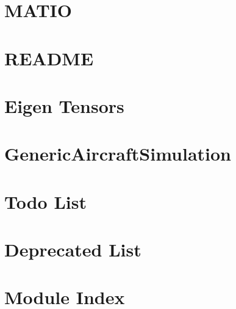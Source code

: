\documentclass[twoside]{book}
\newcommand{\+}{\discretionary{\mbox{\scriptsize$\hookleftarrow$}}{}{}}
\begin{document}
\chapter{M\+A\+T\+IO}
\label{md__c_1__users_janol__desktop__generic_aircraft_simulation_matio__r_e_a_d_m_e}

\chapter{R\+E\+A\+D\+ME}
\label{md__c_1__users_janol__desktop__generic_aircraft_simulation_matio_visual_studio_test_eigen__r_e_a_d_m_e}

\chapter{Eigen Tensors}
\label{md__c_1__users_janol__desktop__generic_aircraft_simulation_matio_visual_studio_test_eigen_unsupp071d30bb2be8c33608386d6ed5d57ce5}

\chapter{Generic\+Aircraft\+Simulation}
\label{md__c_1__users_janol__desktop__generic_aircraft_simulation__r_e_a_d_m_e}

\chapter{Todo List}
\label{todo}

\chapter{Deprecated List}
\label{deprecated}

\chapter{Module Index}

\end{document}
